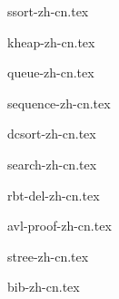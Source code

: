 \documentclass[zihao=5, b5paper, twoside, heading=true]{ctexbook}
\begin{document}
{ssort-zh-cn.tex}

{kheap-zh-cn.tex}

{queue-zh-cn.tex}

{sequence-zh-cn.tex}

{dcsort-zh-cn.tex}

{search-zh-cn.tex}

\appendix
\noappendicestocpagenum
\addappheadtotoc

{rbt-del-zh-cn.tex}

{avl-proof-zh-cn.tex}

{stree-zh-cn.tex}

{bib-zh-cn.tex}

%

\printindex
\end{document}
